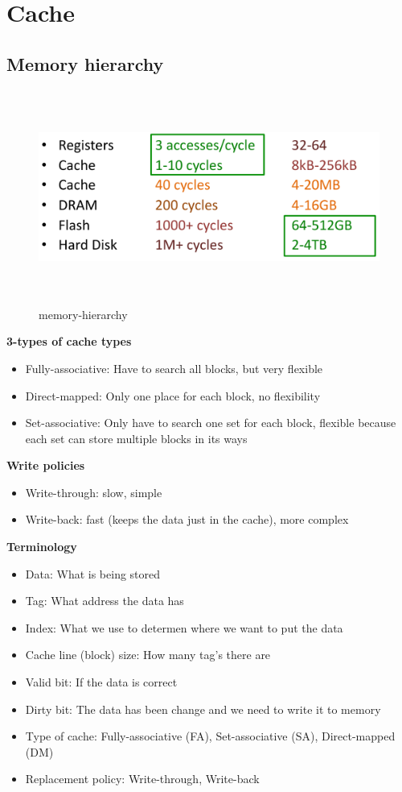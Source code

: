 \newpage


\section{Cache}
\subsection{Memory hierarchy}

\begin{figure}[h]
    \vspace{10mm}
    \centering
    \includegraphics[width=16cm, height=7cm]{image/memory-hierarchy.png}
    \caption{memory-hierarchy}
\end{figure}

\textbf{3-types of cache types}
\begin{itemize}
\item  Fully-associative: Have to search all blocks, but very flexible 
\item  Direct-mapped: Only one place for each block, no flexibility
\item  Set-associative: Only have to search one set for each block,
  flexible because each set can store multiple blocks in its ways 
\end{itemize}

\textbf{Write policies}
\begin{itemize}
\item  Write-through: slow, simple 
\item  Write-back: fast (keeps the data just in the cache), more complex
\end{itemize}

\textbf{Terminology}
\begin{itemize}
\item  Data: What is being stored
\item  Tag: What address the data has
\item  Index: What we use to determen where we want to put the data
\item  Cache line (block) size: How many tag's there are
\item  Valid bit: If the data is correct
\item  Dirty bit: The data has been change and we need to write it to memory
\item  Type of cache: Fully-associative (FA), Set-associative (SA), Direct-mapped (DM)
\item  Replacement policy: Write-through, Write-back  
\end{itemize}


